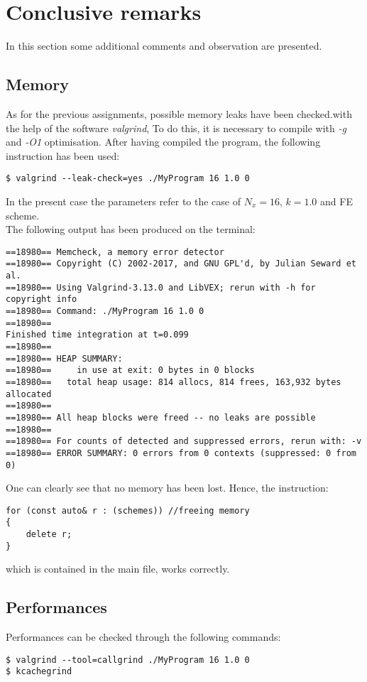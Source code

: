 \documentclass[11pt]{article}
\theoremstyle{theorem}
\theoremstyle{definition}
\begin{document}
\section{Conclusive remarks}
In this section some additional comments and observation are presented.

\subsection{Memory}
As for the previous assignments, possible memory leaks have been checked.with the help of the software \emph{valgrind}, To do this, it is necessary to compile with \emph{-g} and \emph{-O1} optimisation. After having compiled the program, the following instruction has been used:


\begin{lstlisting}
$ valgrind --leak-check=yes ./MyProgram 16 1.0 0
\end{lstlisting}

In the present case the parameters refer to the case of $N_x=16$, $k=1.0$ and FE scheme.\\

The following output has been produced on the terminal:

\begin{verbatim}
==18980== Memcheck, a memory error detector
==18980== Copyright (C) 2002-2017, and GNU GPL'd, by Julian Seward et al.
==18980== Using Valgrind-3.13.0 and LibVEX; rerun with -h for copyright info
==18980== Command: ./MyProgram 16 1.0 0
==18980==
Finished time integration at t=0.099
==18980==
==18980== HEAP SUMMARY:
==18980==     in use at exit: 0 bytes in 0 blocks
==18980==   total heap usage: 814 allocs, 814 frees, 163,932 bytes allocated
==18980==
==18980== All heap blocks were freed -- no leaks are possible
==18980==
==18980== For counts of detected and suppressed errors, rerun with: -v
==18980== ERROR SUMMARY: 0 errors from 0 contexts (suppressed: 0 from 0)
\end{verbatim}

One can clearly see that no memory has been lost. Hence, the instruction:

\begin{lstlisting}
for (const auto& r : (schemes)) //freeing memory
{
	delete r;
}
\end{lstlisting}

which is contained in the main file, works correctly.\\

\subsection{Performances}
\label{subsec:perf}
Performances can be checked through the following commands:
\begin{verbatim}
$ valgrind --tool=callgrind ./MyProgram 16 1.0 0
$ kcachegrind
\end{verbatim}
\end{document}
